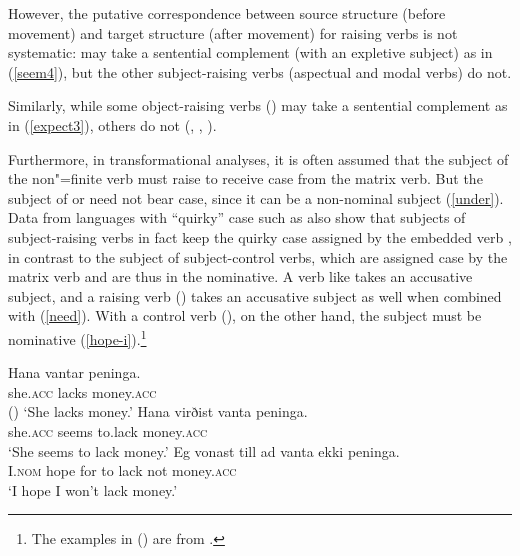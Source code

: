 \noindent
However, the putative correspondence between source structure (before movement) and target structure (after movement) for raising verbs is not
systematic:  may take a sentential complement (with an expletive subject) as in
(\ref{seem4}), but the other subject-raising verbs (aspectual and modal verbs) do not.

\eal
{}
\zl
 
 \noindent
 Similarly, while some object-raising verbs () may take a sentential complement as in (\ref{expect3}), others do not (, , ).
 
\eal
{}
\zl

Furthermore, in transformational analyses, it is often assumed that the subject of the non"=finite verb must raise to receive case from the matrix verb.
 But the subject of  or  need not bear case, since it can be a non-nominal subject (\ref{under}).
Data from languages with ``quirky'' case such as  also show that subjects of
subject-raising verbs in fact keep the quirky case assigned by the embedded verb
\citep[]{Zaenenetal1985}, in contrast to the subject of subject-control verbs, which are assigned
case by the matrix verb and are thus in the nominative. A verb like  takes an accusative
subject, and a raising verb () takes an accusative subject as well when combined with
 (\ref{need}). With a control verb (), on the other hand, the subject must be
nominative (\ref{hope-i}).\footnote{
The examples in () are from  .
}

\eal
\ex 
\gll Hana             vantar peninga.\\
     she.\textsc{acc} lacks  money.\textsc{acc} \\\hfill()
\glt `She lacks money.'
\ex 
\gll Hana             virðist vanta   peninga.\label{need} \\
     she.\textsc{acc} seems   to.lack money.\textsc{acc} \\
\glt `She seems to lack money.'
\ex 
\gll Eg             vonast till ad vanta ekki peninga. \label{hope-i} \\
     I.\textsc{nom} hope   for  to lack  not  money.\textsc{acc} \\
\glt `I hope I won't lack money.'
\zl

